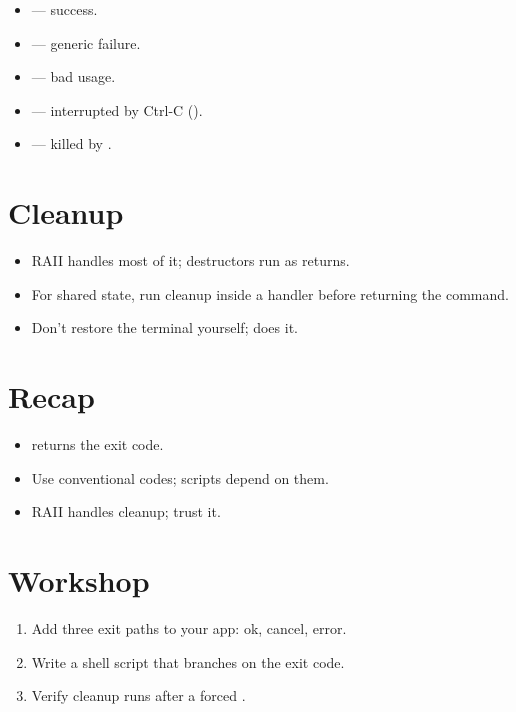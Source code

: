\begin{itemize}[leftmargin=*]
  \item {} — success.
  \item {} — generic failure.
  \item {} — bad usage.
  \item {} — interrupted by Ctrl-C ().
  \item {} — killed by .
\end{itemize}

\section{Cleanup}

\begin{itemize}[leftmargin=*]
  \item RAII handles most of it; destructors run as
     returns.
  \item For shared state, run cleanup inside a 
    handler before returning the  command.
  \item Don't restore the terminal yourself; \maya{} does it.
\end{itemize}

\section{Recap}

\begin{recap}
\begin{itemize}[leftmargin=*]
  \item {} returns the exit code.
  \item Use conventional codes; scripts depend on them.
  \item RAII handles cleanup; trust it.
\end{itemize}
\end{recap}

\section*{Workshop}

\begin{enumerate}[leftmargin=*]
  \item Add three exit paths to your app: ok, cancel,
    error.
  \item Write a shell script that branches on the exit
    code.
  \item Verify cleanup runs after a forced .
\end{enumerate}
